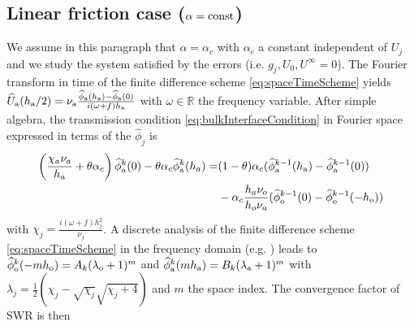 \subsection{Linear friction case ($\alpha = {\rm const}$)}
%
%
We assume in this paragraph that $\alpha=\alpha_{c}$ with $\alpha_{c}$ 
a constant independent of $U_j$ and we study the system satisfied by the errors
(i.e. $g_j, U_0, U^\infty =0$). 
The Fourier transform in time of the finite difference scheme \eqref{eq:spaceTimeScheme} 
yields  
$\widehat{U}_{\rm a}(h_{\rm a}/2) = \nu_{\rm a} \frac{\widehat{\phi}_{\rm a}(h_{\rm a}) - \widehat{\phi}_{\rm a}(0)}{i(\omega+f) h_{\rm a}}$
with $\omega \in \mathbb{R}$ the frequency variable. 
After simple algebra, the transmission condition 
\eqref{eq:bulkInterfaceCondition} in Fourier space expressed 
in terms of the $\widehat{\phi}_j$ is 
\begin{equation} \label{eq:discreteBulkFourier}
\begin{aligned}
 \left( \frac{\chi_a\nu_a}{h_a}+\theta \alpha_c \right) \widehat{\phi}^k_{\rm a}(0) - \theta \alpha_c
\widehat{\phi}^k_{\rm a}(h_a) = &(1-\theta) \alpha_c 
(\widehat{\phi}^{k-1}_{\rm a}(h_{\rm a}) - \widehat{\phi}^{k-1}_{\rm a}(0)) \\
&- \alpha_c \frac{h_a \nu_o}{h_o \nu_a} (\widehat{\phi}^{k-1}_{\rm o}(0) - \widehat{\phi}^{k-1}_{\rm o}(-h_{\rm o}))
\end{aligned}
\end{equation}
with $\chi_j=\frac{i (\omega+f) h_j^2}{\nu_j}$.
A discrete analysis of the finite difference scheme \eqref{eq:spaceTimeScheme} in the
frequency domain (e.g. \cite{wu_optimized_2017}) leads to 
$\widehat{\phi}_{\rm o}^k(-m h_{\rm o}) = A_k (\lambda_{\rm o}+1)^m$
and
$\widehat{\phi}_{\rm a}^k(m h_{\rm a}) = B_k (\lambda_{\rm a}+1)^m$ 
with $\lambda_j = \frac{1}{2}\left(\chi_j - \sqrt{\chi_j} \sqrt{\chi_j + 4}\right)$ 
and $m$ the space index. The convergence factor of SWR is then
